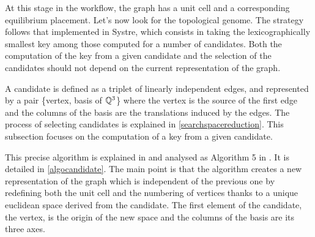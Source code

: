 \documentclass[main.tex]{subfiles}
\begin{document}
At this stage in the workflow, the graph has a unit cell and a corresponding equilibrium placement. Let's now look for the topological genome. The strategy follows that implemented in Systre, which consists in taking the lexicographically smallest key among those computed for a number of candidates. Both the computation of the key from a given candidate and the selection of the candidates should not depend on the current representation of the graph.

A candidate is defined as a triplet of linearly independent edges, and represented by a pair \{vertex, basis of $\mathbb{Q}^3$\} where the vertex is the source of the first edge and the columns of the basis are the translations induced by the edges. The process of selecting candidates is explained in \cref{searchspacereduction}. This subsection focuses on the computation of a key from a given candidate.\\

\label{searchspaceexploration}

This precise algorithm is explained in \cite{Systre} and analysed as Algorithm 5 in \cite{barycentric}. It is detailed in \cref{algocandidate}. The main point is that the algorithm creates a new representation of the graph which is independent of the previous one by redefining both the unit cell and the numbering of vertices thanks to a unique euclidean space derived from the candidate. The first element of the candidate, the vertex, is the origin of the new space and the columns of the basis are its three axes.
\end{document}
